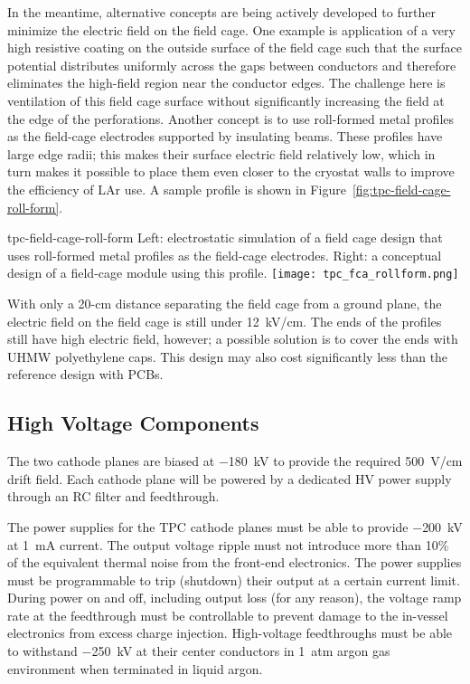 In the meantime, alternative concepts are being actively developed to
further minimize the electric field on the field cage.  One example is application of %
a very high resistive  coating on the outside surface of the
field cage such that the surface potential distributes uniformly
across the gaps between conductors and therefore eliminates the high-field
region near the conductor edges.  The challenge here is %
ventilation of this field cage surface without significantly increasing the
field at the edge of the perforations.  Another concept is to use
roll-formed metal profiles as the field-cage electrodes supported by 
insulating beams.  These profiles have large edge radii; this makes
their surface electric field relatively low, which in turn makes it possible
to place them %
even closer to the cryostat walls to improve the
efficiency of LAr use.  %
A sample profile is shown in
Figure~\ref{fig:tpc-field-cage-roll-form}.  
\begin{cdrfigure}{tpc-field-cage-roll-form}
{Left: electrostatic simulation of a field cage design that uses roll-formed 
metal profiles as the field-cage electrodes.  Right: a conceptual design of a 
field-cage module using this profile.}
\texttt{[image: tpc\_fca\_rollform.png]}
\end{cdrfigure}
With only a 20-cm distance %
separating the field cage from a ground plane, the electric field on the field cage is
still under 12~kV/cm.  The ends of the profiles still have high
electric field, however; a possible solution is to cover the ends with UHMW
polyethylene caps.  This design may also cost significantly less than
the reference design with PCBs.


\subsection{High Voltage Components}  
\label{subsec:fd-ref-hv}
   
The two cathode planes  are biased at $-$180~kV to provide the required
500~V/cm drift field. Each cathode plane will be powered by a
dedicated HV power supply through an RC filter and feedthrough.

The power supplies for the TPC cathode planes  must be able to provide
$-$200~kV at 1~mA current. The output voltage ripple must not
introduce more than 10\% of the equivalent thermal noise from the
front-end electronics.  The power supplies must be programmable to
trip (shutdown) their output at a certain current limit.  During power
on and off, including output loss (for any reason), the voltage ramp
rate at the feedthrough must be controllable to prevent damage to the
in-vessel electronics %
from excess charge injection.  High-voltage
feedthroughs must be able to withstand $-$250~kV at their center
conductors in 1~atm argon gas environment when terminated in liquid
argon.


